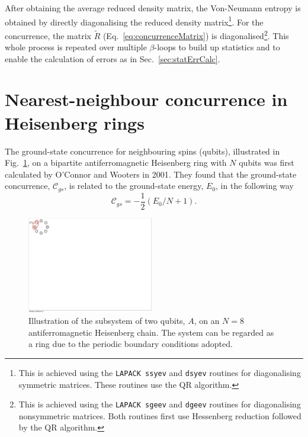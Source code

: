 After obtaining the average reduced density matrix, the Von-Neumann entropy is obtained by directly diagonalising the reduced density matrix\footnote{This is achieved using the \texttt{LAPACK ssyev} and \texttt{dsyev} routines for diagonalising symmetric matrices. These routines use the QR algorithm.}. For the concurrence, the matrix $\tilde{R}$ (Eq.~\ref{eq:concurrenceMatrix}) is diagonalised\footnote{This is achieved using the \texttt{LAPACK sgeev} and \texttt{dgeev} routines for diagonalising nonsymmetric matrices. Both routines first use Hessenberg reduction followed by the QR algorithm.}. This whole process is repeated over multiple $\beta$-loops to build up statistics and to enable the calculation of errors as in Sec.~\ref{sec:statErrCalc}.
\section{Nearest-neighbour concurrence in Heisenberg rings}
The ground-state concurrence for neighbouring spins (qubits), illustrated in Fig.~\ref{fig:HeisenbergRing}, on a bipartite antiferromagnetic Heisenberg ring with $N$ qubits was first calculated by O'Connor and Wooters in 2001\cite{OConnor2001}. They found that the ground-state concurrence, $\mathcal{C}_{gs}$, is related to the ground-state energy, $E_{0}$, in the following way
\begin{equation}
\label{eq:groundstateConcurrence}
\mathcal{C}_{gs} = -\frac{1}{2}(E_{0}/N + 1).
\end{equation}

\begin{figure}[h!]
\begin{center}
\includegraphics[width =0.49\textwidth]{HeisenbergRing.pdf}
\caption{Illustration of the subsystem of two qubits, $A$, on an $N = 8$ antiferromagnetic Heisenberg chain. The system can be regarded as a ring due to the periodic boundary conditions adopted.}
\label{fig:HeisenbergRing}
\end{center}
\end{figure}

